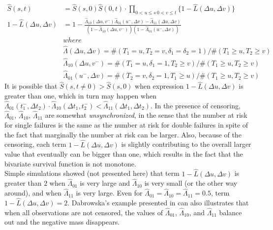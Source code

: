 \documentclass[]{article}
\begin{document}
	$$
	\begin{aligned}
		\hat{S}(s,t) &= \hat{S}(s,0)\hat{S}(0,t)\cdot \prod_{{0<u\leq s~0<v\leq t}}\{1 - \hat{L}(\Delta u, \Delta v)\}\\
    1 - \hat{L}(\Delta u, \Delta v) &= 1 - \frac{\hat{\Lambda}_{10}(\Delta u,v^-)\hat{\Lambda}_{01}(u^-,\Delta v) - \hat{\Lambda}_{11}(\Delta u,\Delta v)}{\left(1-\hat{\Lambda}_{10}(\Delta u,v^-)\right)\left(1-\hat{\Lambda}_{01}(u^-,\Delta v)\right)}\\
  &where\\
	&\hat{\Lambda}(\Delta u, \Delta v) = \#(T_1=u, T_2=v, \delta_1=\delta_2=1)/\#(T_1\geq u, T_2\geq v)\\
	&\hat{\Lambda}_{10}(\Delta u, v^-) = \#(T_1=u, \delta_1=1, T_2\geq v)/\#(T_1\geq u, T_2\geq v)\\
	&\hat{\Lambda}_{01}(u^-,\Delta  v) = \#(T_2=v, \delta_2=1, T_1\geq u)/\#(T_1\geq u, T_2\geq v)
	\end{aligned}
	$$
It is possible that $\hat{S}(s,t\neq 0) > \hat{S}(s,0)$ when expression $1 - \hat{L}(\Delta u, \Delta v)$ is greater than one, which in turn may happen when  $\hat{\Lambda}_{01}(t_1^-,\Delta  t_2) \cdot \hat{\Lambda}_{10}(\Delta t_1, t_2^-)< \hat{\Lambda}_{11}(\Delta t_1, \Delta t_2)$. In the presence of censoring, $\hat{\Lambda}_{01}$, $\hat{\Lambda}_{10}$, $\hat{\Lambda}_{11}$ are somewhat \emph{unsynchronized}, in the sense that the number at risk for single failures is the same as the number at risk for double failures in spite of the fact that marginally the number at risk can be larger. Also, because of the censoring, each term $1 - \hat{L}(\Delta u, \Delta v)$ is slightly contributing to the overall larger value that eventually can be bigger than one, which results in the fact that the bivariate survival function is not monotone.\\
Simple simulations showed (not presented here) that term $1 - \hat{L}(\Delta u, \Delta v)$ is greater than $2$ when $\hat{\Lambda}_{01}$ is very large and $\hat{\Lambda}_{10}$ is very small (or the other way around), and when $\hat{\Lambda}_{11}$ is very large. Even for $\hat{\Lambda}_{01} = \hat{\Lambda}_{10} = \hat{\Lambda}_{11} = 0.5$, term $1 - \hat{L}(\Delta u, \Delta v) = 2$.  Dabrowska's example presented in  can also illustrates that when all observations are not censored, the values of $\hat{\Lambda}_{01}$, $\hat{\Lambda}_{10}$, and $\hat{\Lambda}_{11}$ balance out and the negative mass disappears.\\
\end{document}
